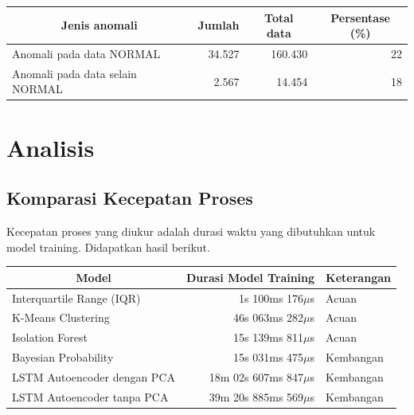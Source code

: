\begin{table}[h]
    \centering
    \begin{tabular}{|l|r|r|r|}
        \hline
        \multicolumn{1}{|c|}{\textbf{Jenis anomali}} & \multicolumn{1}{c|}{\textbf{Jumlah}} & \multicolumn{1}{c|}{\textbf{Total data}} & \multicolumn{1}{c|}{\textbf{Persentase (\%)}} \\ \hline
        Anomali pada data NORMAL                     & 34.527                                & 160.430                                   & 22                                       \\ \hline
        Anomali pada data selain NORMAL              & 2.567                                 & 14.454                                    & 18                                       \\ \hline
    \end{tabular}
\end{table}

\section{Analisis}
\subsection{Komparasi Kecepatan Proses}
Kecepatan proses yang diukur adalah durasi waktu yang dibutuhkan untuk model training. Didapatkan hasil berikut.

\begin{table}[h]
    \centering
    \begin{tabular}{|l|r|l|}
        \hline
        \multicolumn{1}{|c}{\textbf{Model}} & \multicolumn{1}{|c|}{\textbf{Durasi Model Training}} & \multicolumn{1}{c|}{\textbf{Keterangan}} \\ \hline
        Interquartile Range (IQR)   &        1s 100ms 176$\mu$s    & Acuan \\
        K-Means Clustering          &       46s 063ms 282$\mu$s    & Acuan \\
        Isolation Forest            &       15s 139ms 811$\mu$s    & Acuan \\
        Bayesian Probability        &       15s 031ms 475$\mu$s    & Kembangan \\
        LSTM Autoencoder dengan PCA &   18m 02s 607ms 847$\mu$s    & Kembangan \\
        LSTM Autoencoder tanpa PCA  &   39m 20s 885ms 569$\mu$s    & Kembangan \\
        \hline
    \end{tabular}
\end{table}


